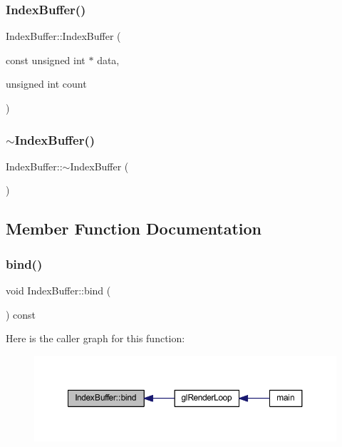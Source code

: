 \subsubsection{\texorpdfstring{Index\+Buffer()}{IndexBuffer()}}
{\footnotesize\ttfamily Index\+Buffer\+::\+Index\+Buffer (\begin{DoxyParamCaption}\item[{const unsigned int $\ast$}]{data,  }\item[{unsigned int}]{count }\end{DoxyParamCaption})}

\mbox{\label{class_index_buffer_a348889936f378b7942c1e01d83e42866}} 
\subsubsection{\texorpdfstring{$\sim$\+Index\+Buffer()}{~IndexBuffer()}}
{\footnotesize\ttfamily Index\+Buffer\+::$\sim$\+Index\+Buffer (\begin{DoxyParamCaption}{ }\end{DoxyParamCaption})}



\subsection{Member Function Documentation}
\mbox{\label{class_index_buffer_ae9d8b583fd99e86874cc8c46f2ed1c17}} 
\subsubsection{\texorpdfstring{bind()}{bind()}}
{\footnotesize\ttfamily void Index\+Buffer\+::bind (\begin{DoxyParamCaption}{ }\end{DoxyParamCaption}) const}

Here is the caller graph for this function\+:
\nopagebreak
\begin{figure}[H]
\begin{center}
\leavevmode
\includegraphics[width=350pt]{class_index_buffer_ae9d8b583fd99e86874cc8c46f2ed1c17_icgraph}
\end{center}
\end{figure}
\mbox{\label{class_index_buffer_a3ec4dba9cc97dfedac07d6375d25b3b6}} 
